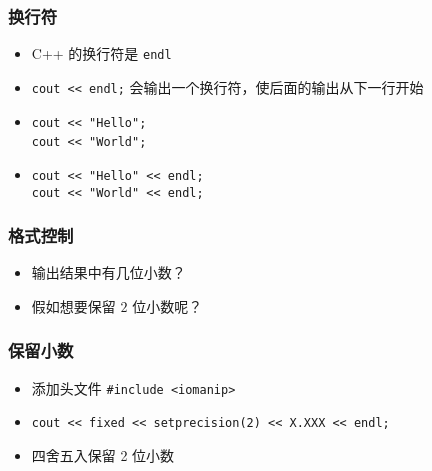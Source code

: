 \begin{frame}[fragile]
    \frametitle{换行符}

    \begin{itemize}
        \item<1-> C++ 的换行符是 \lstinline|endl|

        \item<2-> \lstinline|cout << endl;| 会输出一个换行符，使后面的输出从下一行开始

        \item<3->
             {
                \lstinline|cout << "Hello";|\\ 
                \lstinline|cout << "World";|
            }{
                \\ 
            }

        \item<4->
            \lstinline|cout << "Hello" << endl;|\\ 
            \lstinline|cout << "World" << endl;|
    \end{itemize}
\end{frame}

\begin{frame}[fragile]
    \frametitle{格式控制}

    

    \begin{itemize}
        \item<2-> 输出结果中有几位小数？
        \item<2-> 假如想要保留 $2$ 位小数呢？
    \end{itemize}
\end{frame}

\begin{frame}[fragile]
    \frametitle{保留小数}

    \begin{itemize}[<+->]
        \item 添加头文件 \lstinline|#include <iomanip>|
        \item \lstinline|cout << fixed << setprecision(2) << X.XXX << endl;|
        \item 四舍五入保留 2 位小数
    \end{itemize}
\end{frame}

